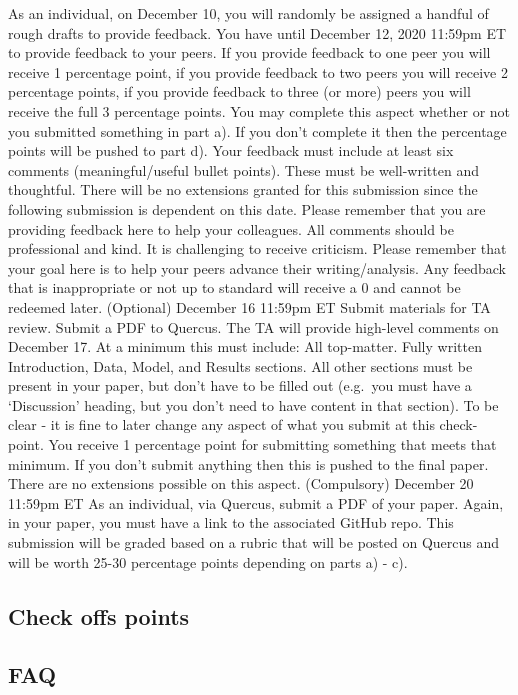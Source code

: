 \documentclass[
]{book}
\begin{document}
As an individual, on December 10, you will randomly be assigned a handful of rough drafts to provide feedback. You have until December 12, 2020 11:59pm ET to provide feedback to your peers.
If you provide feedback to one peer you will receive 1 percentage point, if you provide feedback to two peers you will receive 2 percentage points, if you provide feedback to three (or more) peers you will receive the full 3 percentage points.
You may complete this aspect whether or not you submitted something in part a). If you don't complete it then the percentage points will be pushed to part d).
Your feedback must include at least six comments (meaningful/useful bullet points). These must be well-written and thoughtful.
There will be no extensions granted for this submission since the following submission is dependent on this date.
Please remember that you are providing feedback here to help your colleagues. All comments should be professional and kind. It is challenging to receive criticism. Please remember that your goal here is to help your peers advance their writing/analysis. Any feedback that is inappropriate or not up to standard will receive a 0 and cannot be redeemed later.
(Optional) December 16 11:59pm ET
Submit materials for TA review.
Submit a PDF to Quercus. The TA will provide high-level comments on December 17.
At a minimum this must include:
All top-matter.
Fully written Introduction, Data, Model, and Results sections.
All other sections must be present in your paper, but don't have to be filled out (e.g.~you must have a `Discussion' heading, but you don't need to have content in that section).
To be clear - it is fine to later change any aspect of what you submit at this check-point.
You receive 1 percentage point for submitting something that meets that minimum. If you don't submit anything then this is pushed to the final paper.
There are no extensions possible on this aspect.
(Compulsory) December 20 11:59pm ET
As an individual, via Quercus, submit a PDF of your paper. Again, in your paper, you must have a link to the associated GitHub repo.
This submission will be graded based on a rubric that will be posted on Quercus and will be worth 25-30 percentage points depending on parts a) - c).

\hypertarget{check-offs-points-7}{%
\subsection{Check offs points}\label{check-offs-points-7}}

\hypertarget{faq-7}{%
\subsection{FAQ}\label{faq-7}}

  
\end{document}
